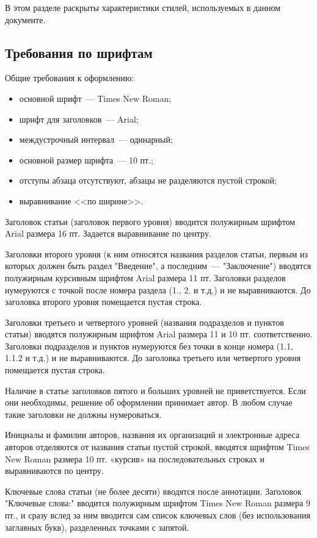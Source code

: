 \documentclass{ProcISPRAS}
\begin{document}
В этом разделе раскрыты характеристики стилей, используемых в данном документе.

\subsection{Требования по шрифтам}

Общие требования к оформлению:
\begin{itemize}
  \item основной шрифт~--- Times New Roman;
  \item шрифт для заголовков~--- Arial;
  \item междустрочный интервал~--- одинарный;
  \item основной размер шрифта~--- 10 пт.;
  \item отступы абзаца отсутствуют, абзацы не разделяются пустой строкой;
  \item выравнивание <<по ширине>>.
\end{itemize}

Заголовок статьи (заголовок первого уровня) вводится полужирным шрифтом Arial
размера 16 пт. Задается выравнивание по центру.

Заголовки второго уровня (к ним относятся названия разделов статьи, первым из
которых должен быть раздел "Введение", а последним~--- "Заключение") вводятся
полужирным курсивным шрифтом Arial размера 11 пт. Заголовки разделов нумеруются
с точкой после номера раздела (1., 2. и т.д.) и не выравниваются. До заголовка
второго уровня помещается пустая строка.

Заголовки третьего и четвертого уровней (названия подразделов и пунктов статьи)
вводятся полужирным шрифтом Arial размера 11 и 10 пт. соответственно. Заголовки
подразделов и пунктов нумеруются без точки в конце номера (1.1, 1.1.2 и т.д.) и
не выравниваются. До заголовка третьего или четвертого уровня помещается пустая
строка.

Наличие в статье заголовков пятого и больших уровней не приветствуется. Если они
необходимы, решение об оформлении принимает автор. В любом случае такие
заголовки не должны нумероваться.

Инициалы и фамилии авторов, названия их организаций  и электронные адреса
авторов отделяются от названия статьи пустой строкой, вводятся шрифтом Times New
Roman размера 10 пт. «курсив» на последовательных строках и выравниваются по
центру.

Ключевые слова статьи (не более десяти) вводятся после аннотации. Заголовок
"Ключевые слова:" вводится полужирным шрифтом Times New Roman размера 9 пт., и
сразу вслед за ним вводится сам список ключевых слов (без использования
заглавных букв), разделенных точками с запятой.
\end{document}
